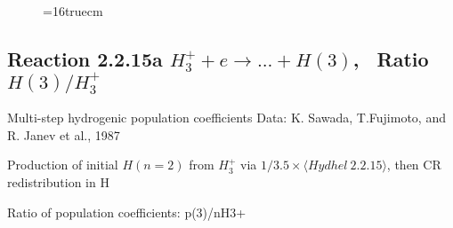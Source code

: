 \documentclass[12pt,dvipdfmx]{article}
\begin{document}
\begin{figure} \label{2.2.14e}
\epsfxsize=16truecm
\end{figure}
\newpage

\subsection{
Reaction 2.2.15a $ H_3^+ + e \rightarrow ...+ H(3) $, \   Ratio $H(3)/H_3^+  $
}

 Multi-step hydrogenic population coefficients
 Data: K. Sawada, T.Fujimoto,  \cite{kn:Sawada} and R. Janev et al., 1987

 Production of initial $H(n=2)$ from $H_3^+$ via $1/3.5 \times \langle Hydhel~ 2.2.15\rangle$,
 then CR redistribution in H

 Ratio of population coefficients: p(3)/nH3+
\end{document}
